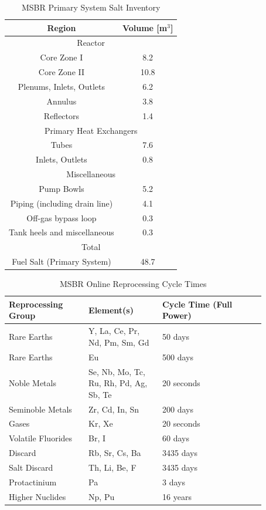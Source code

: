 \begin{table}[H]
\renewcommand{\arraystretch}{1.25}
\caption{MSBR Primary System Salt Inventory \cite{robertson_conceptual_1971}}
\label{tab:msbr_salt_data}
\begin{center}
\begin{tabular}{  c | c  }
 \hline
 Region & Volume [m$^3$]\\
 \hline
 \multicolumn{2}{c}{Reactor}\\
  \hline
 Core Zone I & 8.2\\
 Core Zone II & 10.8\\
 Plenums, Inlets, Outlets & 6.2\\
 Annulus & 3.8\\
 Reflectors & 1.4\\
 \hline
\multicolumn{2}{c}{Primary Heat Exchangers}\\
 \hline
 Tubes & 7.6\\
 Inlets, Outlets & 0.8\\
  \hline
 \multicolumn{2}{c}{Miscellaneous}\\
  \hline
 Pump Bowls & 5.2\\
 Piping (including drain line) & 4.1\\
 Off-gas bypass loop & 0.3\\
 Tank heels and miscellaneous & 0.3\\
 \hline
  \multicolumn{2}{c}{Total}\\
  \hline
 Fuel Salt (Primary System) & 48.7\\
 \hline
\end{tabular}
\end{center}
\end{table}


\begin{table}[H]
\renewcommand{\arraystretch}{1.25}
\caption{MSBR Online Reprocessing Cycle Times \cite{robertson_conceptual_1971}}
\label{tab:msbr_cycle_times}
\begin{center}
\begin{tabular}{ p{0.27\linewidth} | p{0.25\linewidth} | p{0.35\linewidth} }
 \hline
 Reprocessing Group & Element(s) & Cycle Time (Full Power)\\
 \hline
 \hline
 Rare Earths & Y, La, Ce, Pr, Nd, Pm, Sm, Gd & 50 days\\
 Rare Earths & Eu & 500 days\\
 Noble Metals  & Se, Nb, Mo, Tc, Ru, Rh, Pd, Ag, Sb, Te & 20 seconds\\
 Seminoble Metals & Zr, Cd, In, Sn &  200 days\\
 Gases & Kr, Xe & 20 seconds\\
 Volatile Fluorides & Br, I & 60 days\\
 Discard & Rb, Sr, Cs, Ba & 3435 days\\
 Salt Discard & Th, Li, Be, F & 3435 days\\
 Protactinium & Pa & 3 days\\
 Higher Nuclides & Np, Pu & 16 years\\
 \hline
\end{tabular}
\end{center}
\end{table}


